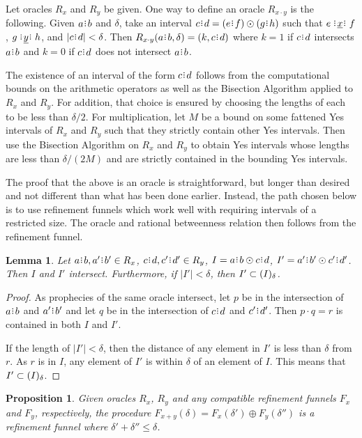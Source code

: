 \documentclass[12pt]{article}
\newtheorem{lemma}{Lemma}[section]
\newtheorem{proposition}{Proposition}[section]
\begin{document}
Let oracles $R_x$ and $R_y$ be given. One way to define an oracle $R_{x \cdot y}$ is the following. Given $a\rint b$ and $\delta$, take an interval $c\rint d = (e\rint f) \odot (g\rint h)$ such that $e \xrel f$, $g\xrel[y] h$, and $|c\rint d| < \delta$. Then $R_{x \cdot y}(a\rint b, \delta) = (k, c\rint d)$ where $k=1$ if $c\rint d$ intersects $a\rint b$ and $k=0$ if $c \rint d$ does not intersect $a\rint b$. 

The existence of an interval of the form $c\rint d$ follows from the computational bounds on the arithmetic operators as well as the Bisection Algorithm applied to $R_x$ and $R_y$. For addition, that choice is ensured by choosing the lengths of each to be less than $\delta/2$. For multiplication, let $M$ be a bound on some fattened Yes intervals of $R_x$ and $R_y$ such that they strictly contain other Yes intervals. Then use the Bisection Algorithm on $R_x$ and $R_y$ to obtain Yes intervals whose lengths are less than $\delta/(2M)$ and are strictly contained in the bounding Yes intervals. 

The proof that the above is an oracle is straightforward, but longer than desired and not different than what has been done earlier. Instead, the path chosen below is to use refinement funnels which work well with requiring intervals of a restricted size. The oracle and rational betweenness relation then follows from the refinement funnel. 

\begin{lemma}
    Let $a\rint b, a'\rint b' \in R_{x}$, $c\rint d, c'\rint d' \in R_y$, $I =  a\rint b \odot c\rint d$, $I' =  a'\rint b' \odot c'\rint d'$. Then $I$ and $I'$ intersect. Furthermore, if $|I'| < \delta$, then $I' \subset (I)_{\delta}$.
\end{lemma}

\begin{proof}   
    As prophecies of the same oracle intersect, let $p$ be in the intersection of $a\rint b$ and $a'\rint b'$ and let $q$ be in the intersection of $c\rint d$ and $c'\rint d'$. Then $p \cdot q = r$ is contained in both $I$ and $I'$. 
    
    If the length of $|I'| < \delta$, then the distance of any element in $I'$ is less than $\delta$ from $r$. As $r$ is in $I$, any element of $I'$ is within $\delta$ of an element of $I$. This means that $I' \subset (I)_{\delta}$.
\end{proof}


\begin{proposition}
    Given oracles $R_x$, $R_y$ and any compatible refinement funnels $F_{x}$ and $F_{y}$, respectively, the procedure $F_{x+y} (\delta) = F_x (\delta') \oplus F_y (\delta'')$ is a refinement funnel where $\delta' + \delta'' \leq \delta$. 
\end{proposition}
\end{document}
